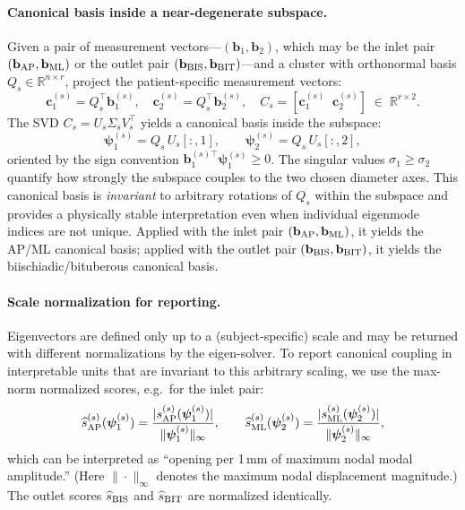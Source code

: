 \documentclass[11pt]{article}
\begin{document}
\paragraph{Canonical basis inside a near-degenerate subspace.}
Given a pair of measurement vectors---$(\mathbf b_1, \mathbf b_2)$, which may be the inlet pair $(\mathbf b_{\rm AP}, \mathbf b_{\rm ML})$ or the outlet pair $(\mathbf b_{\rm BIS}, \mathbf b_{\rm BIT})$---and a cluster with orthonormal basis $Q_s\in\mathbb R^{n\times r}$, project the patient-specific measurement vectors:
\begin{equation}\label{eq:canonical-proj}
\mathbf c_{1}^{(s)} = Q_s^\top \mathbf b_{1}^{(s)},\quad
\mathbf c_{2}^{(s)} = Q_s^\top \mathbf b_{2}^{(s)},\quad
C_s = [\mathbf c_{1}^{(s)}\;\; \mathbf c_{2}^{(s)}]\;\in\;\mathbb R^{r\times 2}.
\end{equation}
The SVD $C_s=U_s\Sigma_s V_s^\top$ yields a canonical basis inside the subspace:
\begin{equation}\label{eq:canonical-basis}
\boldsymbol\psi_1^{(s)} = Q_s\,U_s[:,1],\qquad
\boldsymbol\psi_2^{(s)} = Q_s\,U_s[:,2],
\end{equation}
oriented by the sign convention $\mathbf b_1^{(s)\top}\boldsymbol\psi_1^{(s)}\ge 0$.
The singular values $\sigma_1\ge\sigma_2$ quantify how strongly the subspace couples to the two chosen diameter axes.
This canonical basis is \emph{invariant} to arbitrary rotations of $Q_s$ within the subspace and provides a physically stable interpretation even when individual eigenmode indices are not unique.
Applied with the inlet pair $(\mathbf b_{\rm AP}, \mathbf b_{\rm ML})$, it yields the AP/ML canonical basis; applied with the outlet pair $(\mathbf b_{\rm BIS}, \mathbf b_{\rm BIT})$, it yields the biischiadic/bituberous canonical basis.

\paragraph{Scale normalization for reporting.}
Eigenvectors are defined only up to a (subject-specific) scale and may be returned with different normalizations by the eigen-solver.
To report canonical coupling in interpretable units that are invariant to this arbitrary scaling, we use the max-norm normalized scores, e.g.\ for the inlet pair:
\begin{equation}
\widehat s_{\rm AP}^{(s)}(\boldsymbol\psi_1^{(s)})=\frac{|s_{\rm AP}^{(s)}(\boldsymbol\psi_1^{(s)})|}{\|\boldsymbol\psi_1^{(s)}\|_\infty},\qquad
\widehat s_{\rm ML}^{(s)}(\boldsymbol\psi_2^{(s)})=\frac{|s_{\rm ML}^{(s)}(\boldsymbol\psi_2^{(s)})|}{\|\boldsymbol\psi_2^{(s)}\|_\infty},
\end{equation}
which can be interpreted as ``opening per 1\,mm of maximum nodal modal amplitude.'' (Here $\|\cdot\|_\infty$ denotes the maximum nodal displacement magnitude.)
The outlet scores $\widehat s_{\rm BIS}$ and $\widehat s_{\rm BIT}$ are normalized identically.
\end{document}
